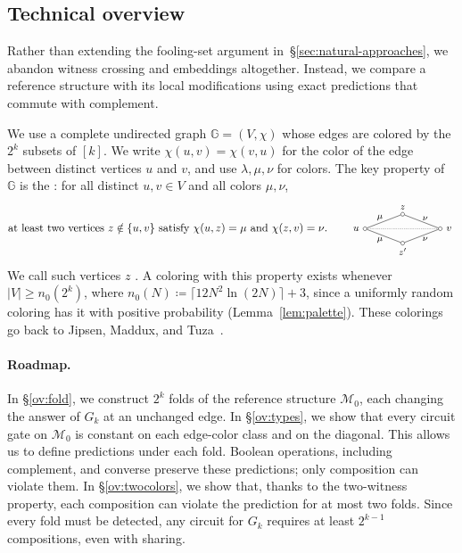 \subsection{Technical overview}\label{sec:approach}\label{sec:overview}\label{ov:structure}

Rather than extending the fooling-set argument in~\S\ref{sec:natural-approaches}, we abandon witness crossing and embeddings altogether. Instead, we compare a reference structure with its local modifications using exact predictions that commute with complement.

\smallskip
{}
We use a complete undirected graph $\mathbb{G} = (V,\chi)$ whose edges are colored by the $2^k$ subsets of $[k]$.
We write $\chi(u,v)=\chi(v,u)$ for the color of the edge between distinct vertices $u$ and $v$,
and use $\lambda,\mu,\nu$ for colors.
The key property of $\mathbb{G}$ is the : for all distinct
$u,v\in V$ and all colors $\mu,\nu$,
\[
\text{at least two vertices $z\notin\{u,v\}$ satisfy $\chi(u,z)=\mu$ and
 $\chi(z,v)=\nu$.}
 \qquad
 \begin{tikzpicture}[baseline={([yshift=-0.55ex]u.center)},
   every node/.style={font=\footnotesize},vtx/.style={circle,draw,inner sep=1.2pt}]
 \node[vtx,label={[font=\small]left:$u$}] (u) at (0,0) {};
 \node[vtx,label={[font=\small]right:$v$}] (v) at (2.4,0) {};
 \node[vtx,label={[label distance=-1pt]above:$z$}] (z) at (1.2,0.46) {};
 \node[vtx,label={[label distance=-1pt]below:$z'$}] (z2) at (1.2,-0.46) {};
 \draw (u) -- node[above left=-2.5pt] {$\mu$} (z);
 \draw (z) -- node[above right=-2.5pt] {$\nu$} (v);
 \draw (u) -- node[below left=-2.5pt] {$\mu$} (z2);
 \draw (z2) -- node[below right=-2.5pt] {$\nu$} (v);
 \draw[densely dotted] (u) -- (v);
 \end{tikzpicture}
\]
We call such vertices $z$ .
A coloring with this property exists whenever
$|V|\ge n_0(2^k)$, where
$n_0(N)\coloneqq\lceil12N^2\ln(2N)\rceil+3$, since a uniformly random
coloring has it with positive probability
(Lemma~\ref{lem:palette}). These colorings go back to Jipsen, Maddux, and
Tuza~\citep{jipsen-maddux-tuza1995}.

\paragraph{Roadmap.}
In \S\ref{ov:fold}, we construct $2^k$ folds of the reference structure $\mathcal M_0$, each changing the answer of $G_k$ at an unchanged edge.
%
In \S\ref{ov:types}, we show that every circuit gate on $\mathcal M_0$ is constant on each edge-color class and on the diagonal. This allows us to define predictions under each fold.
Boolean operations, including complement, and converse preserve these predictions; only composition can violate them.
%
In \S\ref{ov:twocolors}, we show that, thanks to the two-witness property, each composition can violate the prediction for at most two folds. Since every fold must be detected, any circuit for $G_k$ requires at least $2^{k-1}$ compositions, even with sharing.

